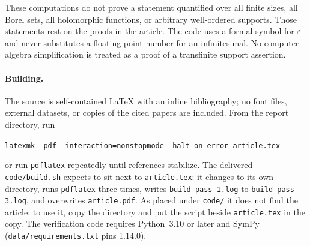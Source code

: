 \documentclass[11pt,letterpaper]{article}
\theoremstyle{definition}
\newcommand{\eps}{\varepsilon}
\numberwithin{equation}{section}
\begin{document}
These computations do not prove a statement quantified over all finite sizes, all Borel sets, all holomorphic functions, or arbitrary well-ordered supports. Those statements rest on the proofs in the article. The code uses a formal symbol for $\eps$ and never substitutes a floating-point number for an infinitesimal. No computer algebra simplification is treated as a proof of a transfinite support assertion.

\paragraph{Building.}
The source is self-contained LaTeX with an inline bibliography; no font files, external datasets, or copies of the cited papers are included. From the report directory, run
\begin{center}
\texttt{latexmk -pdf -interaction=nonstopmode -halt-on-error article.tex}
\end{center}
or run \texttt{pdflatex} repeatedly until references stabilize. The delivered \texttt{code/build.sh} expects to sit next to \texttt{article.tex}: it changes to its own directory, runs \texttt{pdflatex} three times, writes \texttt{build-pass-1.log} to \texttt{build-pass-3.log}, and overwrites \texttt{article.pdf}. As placed under \texttt{code/} it does not find the article; to use it, copy the directory and put the script beside \texttt{article.tex} in the copy. The verification code requires Python~3.10 or later and SymPy (\texttt{data/requirements.txt} pins 1.14.0).
\end{document}
